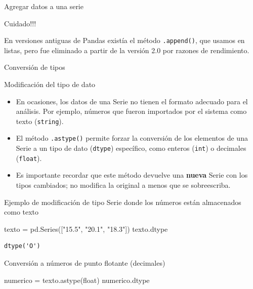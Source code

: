 \documentclass[
  ignorenonframetext,
  aspectratio=169,
  spanish,
]{beamer}
\newenvironment{Shaded}{\begin{snugshade}}{\end{snugshade}}
\newcommand{\BuiltInTok}[1]{\textcolor[rgb]{0.00,0.23,0.31}{#1}}
\newcommand{\NormalTok}[1]{\textcolor[rgb]{0.00,0.23,0.31}{#1}}
\newcommand{\OperatorTok}[1]{\textcolor[rgb]{0.37,0.37,0.37}{#1}}
\newcommand{\StringTok}[1]{\textcolor[rgb]{0.13,0.47,0.30}{#1}}
\providecommand{\tightlist}{%
  \setlength{\itemsep}{0pt}\setlength{\parskip}{0pt}}
\newcommand*\circled[1]{\tikz[baseline=(char.base)]{
          \node[shape=circle,draw,inner sep=1pt] (char) {{\scriptsize#1}};}}
\begin{document}
\begin{frame}[fragile]{Agregar datos a una serie}
\begin{block}{Cuidado!!!}
\begin{tcolorbox}
En versiones antiguas de Pandas existía el método \texttt{.append()},
que usamos en listas, pero fue eliminado a partir de la versión 2.0 por
razones de rendimiento.

\end{tcolorbox}
\end{block}
\end{frame}

\begin{frame}[fragile]{Conversión de tipos}
\label{conversiuxf3n-de-tipos}
\begin{block}{Modificación del tipo de dato}
\label{modificaciuxf3n-del-tipo-de-dato}

\begin{itemize}
\tightlist
\item
  En ocasiones, los datos de una Serie no tienen el formato adecuado
  para el análisis. Por ejemplo, números que fueron importados por el
  sistema como texto (\texttt{string}).
\item
  El método \texttt{.astype()} permite forzar la conversión de los
  elementos de una Serie a un tipo de dato (\texttt{dtype}) específico,
  como enteros (\texttt{int}) o decimales (\texttt{float}).
\item
  Es importante recordar que este método devuelve una \textbf{nueva}
  Serie con los tipos cambiados; no modifica la original a menos que se
  sobreescriba.
\end{itemize}
\end{block}

\begin{block}{Ejemplo de modificación de tipo}
\label{ejemplo-de-modificaciuxf3n-de-tipo}
Serie donde los números están almacenados como texto

\begin{Shaded}
\begin{Highlighting}[]
\NormalTok{texto }\OperatorTok{=}\NormalTok{ pd.Series([}\StringTok{"15.5"}\NormalTok{, }\StringTok{"20.1"}\NormalTok{, }\StringTok{"18.3"}\NormalTok{])}
\NormalTok{texto.dtype }
\end{Highlighting}
\end{Shaded}

\begin{verbatim}
dtype('O')
\end{verbatim}

Conversión a números de punto flotante (decimales)

\label{annotated-cell-19}%
\begin{Shaded}
\begin{Highlighting}[]
\NormalTok{numerico }\OperatorTok{=}\NormalTok{ texto.astype(}\BuiltInTok{float}\NormalTok{) }\hspace*{\fill}\NormalTok{\circled{2}}
\NormalTok{numerico.dtype }\hspace*{\fill}\NormalTok{\circled{3}}
\end{Highlighting}
\end{Shaded}


\end{block}
\end{frame}
\end{document}
